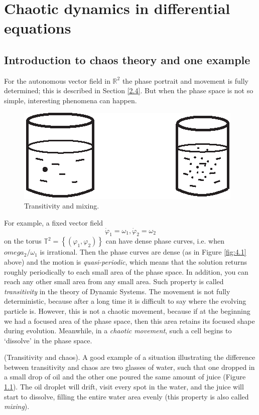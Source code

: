 \chapter{Chaotic dynamics in differential equations}
\section{Introduction to chaos theory and one example}

For the autonomous vector field in $\mathbb{R}^{2}$ the phase portrait and movement is fully determined; this is described in Section \ref{2.4}. But when the phase space is not so simple, interesting phenomena can happen.

\begin{figure}[!ht]
	\centering
	\includegraphics [scale=1.5]{jtr51}
	\caption{Transitivity and mixing.}
	\label{fig:5.1}
\end{figure}

For example, a fixed vector field
$$
\dot{\varphi}_{1}=\omega _{1},\dot{\varphi}_{2}=\omega _{2}
$$
on the torus $\mathbb{T}^{2}=\left\{ \left( \varphi _{1}, \varphi_{2}\right) \right\} $ can have dense phase curves, i.e. when $omega_{2}/\omega _{1}$ is irrational. Then the phase curves are dense (as in Figure \ref{fig:4.1} above) and the motion is \emph{quasi-periodic}, which means that the solution returns roughly periodically to each small area of the phase space. In addition, you can reach any other small area from any small area. Such property is called \emph{transitivity} in the theory of Dynamic Systems. The movement is not fully deterministic, because after a long time it is difficult to say where the evolving particle is. However, this is not a chaotic movement, because if at the beginning we had a focused area of the phase space, then this area retains its focused shape during evolution. Meanwhile, in a \emph{chaotic movement}, such a cell begins to `dissolve' in the phase space.

\begin{example} (Transitivity and chaos).
	A good example of a situation illustrating the difference between transitivity and chaos are two glasses of water, such that one dropped in a small drop of oil and the other one poured the same amount of juice (Figure \ref{fig:5.1}). The oil droplet will drift, visit every spot in the water, and the juice will start to dissolve, filling the entire water area evenly (this property is also called \emph{mixing}).
\end{example}

